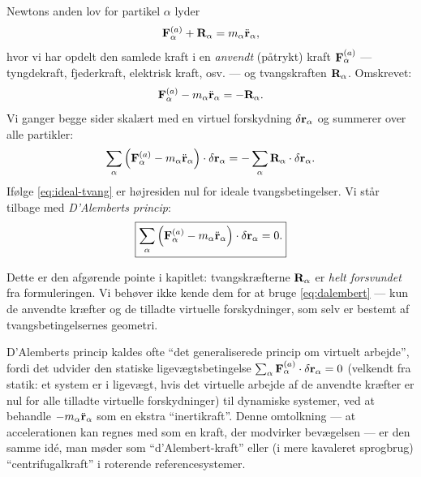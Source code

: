 Newtons anden lov for partikel $\alpha$ lyder
\begin{equation}
  \vb{F}_\alpha^{(a)} + \vb{R}_\alpha = m_\alpha\ddot{\vb{r}}_\alpha,
\end{equation}
hvor vi har opdelt den samlede kraft i en \emph{anvendt} (påtrykt) kraft
$\vb{F}_\alpha^{(a)}$ — tyngdekraft, fjederkraft, elektrisk kraft, osv.
— og tvangskraften $\vb{R}_\alpha$. Omskrevet:
\begin{equation}
  \vb{F}_\alpha^{(a)} - m_\alpha\ddot{\vb{r}}_\alpha = -\vb{R}_\alpha.
\end{equation}
Vi ganger begge sider skalært med en virtuel forskydning
$\delta\vb{r}_\alpha$ og summerer over alle partikler:
\begin{equation}
  \sum_\alpha \left(\vb{F}_\alpha^{(a)} - m_\alpha\ddot{\vb{r}}_\alpha\right)\cdot\delta\vb{r}_\alpha
  = -\sum_\alpha \vb{R}_\alpha\cdot\delta\vb{r}_\alpha.
\end{equation}
Ifølge \eqref{eq:ideal-tvang} er højresiden nul for ideale
tvangsbetingelser. Vi står tilbage med \emph{D'Alemberts
princip}:
\begin{equation}
  \boxed{\sum_\alpha \left(\vb{F}_\alpha^{(a)} - m_\alpha\ddot{\vb{r}}_\alpha\right)\cdot\delta\vb{r}_\alpha = 0.}
  \label{eq:dalembert}
\end{equation}

Dette er den afgørende pointe i kapitlet: tvangskræfterne
$\vb{R}_\alpha$ er \emph{helt forsvundet} fra formuleringen. Vi behøver
ikke kende dem for at bruge \eqref{eq:dalembert} — kun de anvendte
kræfter og de tilladte virtuelle forskydninger, som selv er bestemt af
tvangsbetingelsernes geometri.

\begin{bemaerkning}
D'Alemberts princip kaldes ofte ``det generaliserede princip om virtuelt
arbejde'', fordi det udvider den statiske ligevægtsbetingelse
$\sum_\alpha \vb{F}_\alpha^{(a)}\cdot\delta\vb{r}_\alpha = 0$ (velkendt
fra statik: et system er i ligevægt, hvis det virtuelle arbejde af de
anvendte kræfter er nul for alle tilladte virtuelle forskydninger) til
dynamiske systemer, ved at behandle $-m_\alpha\ddot{\vb{r}}_\alpha$ som
en ekstra ``inertikraft''. Denne omtolkning — at accelerationen kan
regnes med som en kraft, der modvirker bevægelsen — er den samme idé,
man møder som ``d'Alembert-kraft'' eller (i mere kavaleret sprogbrug)
``centrifugalkraft'' i roterende referencesystemer.
\end{bemaerkning}

